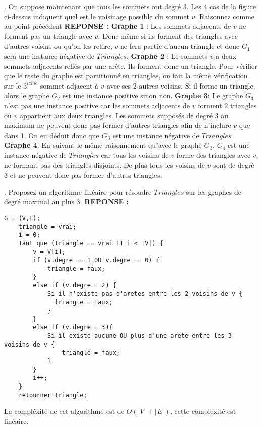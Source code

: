 \documentclass{article}
\begin{document}
    . On suppose maintenant que tous les sommets ont degré 3.
    Les 4 cas de la figure ci-dessus indiquent quel est le voisinage possible du sommet $v$. Raisonnez comme au point précédent
    \smallbreak
    \noindent \textbf{REPONSE :} \smallbreak
    \noindent\textbf{Graphe 1} : Les sommets adjacents de $v$ ne forment pas un triangle avec $v$. Donc même si ils forment des triangles avec d'autres voisins ou qu'on les retire, $v$ ne fera partie d'aucun triangle et donc $G_{1}$ sera une instance négative de $Triangles$.
    \smallbreak
    \noindent \textbf{Graphe 2} : Le sommets $v$ a deux sommets adjacents reliés par une arête. Ils forment donc un triangle. Pour vérifier que le reste du graphe est partitionné en triangles, on fait la même vérification sur le $3^{ieme}$ sommet adjacent à $v$ avec ses 2 autres voisins. Si il forme un triangle, alors le graphe $G_{2}$ est une instance positive sinon non.
    \smallbreak
    \noindent \textbf{Graphe 3}: Le graphe $G_{3}$ n'est pas une instance positive car les sommets adjacents de $v$ forment 2 triangles où $v$ appartient aux deux triangles. Les sommets supposés de degré 3 au maximum ne peuvent donc pas former d'autres triangles afin de n'inclure $v$ que dans 1. On en déduit donc que $G_{3}$ est une instance négative de $Triangles$ 
    \smallbreak
    \noindent \textbf{Graphe 4}: En suivant le même raisonnement qu'avec le graphe $G_{3}$, $G_{4}$ est une instance négative de $Triangles$ car tous les voisins de $v$ forme des triangles avec $v$, ne formant pas des triangles disjoints. De plus tous les voisins de $v$ sont de degré 3 et ne peuvent donc pas former d'autres triangles.
    \bigbreak
    
    . Proposez un algorithme linéaire pour résoudre $Triangles$ sur les graphes de degré maximal au plus 3.
    \smallbreak
    \noindent \textbf{REPONSE :}
    \smallbreak
    \begin{lstlisting}[caption=Algortihme Triangles]
    G = (V,E);
    triangle = vrai;
    i = 0;
    Tant que (triangle == vrai ET i < |V|) {
        v = V[i];
        if (v.degre == 1 OU v.degre == 0) {
            triangle = faux;
        }
        else if (v.degre = 2) {
            Si il n'existe pas d'aretes entre les 2 voisins de v {
              triangle = faux;
            }
        }
        else if (v.degre = 3){
            Si il existe aucune OU plus d'une arete entre les 3 voisins de v {
                triangle = faux;
            }
        }
        i++;
    }
    retourner triangle;
    \end{lstlisting}
    \bigbreak
    La compléxité de cet algorithme est de $O(|V| + |E|)$, cette complexité est linéaire.
    \bigbreak
    
\end{document}
